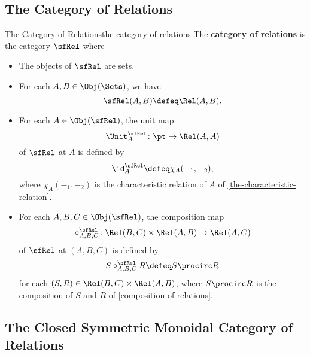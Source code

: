 \subsection{The Category of Relations}\label{subsection-the-category-of-relations}
\begin{definition}{The Category of Relations}{the-category-of-relations}%
    The \textbf{category of relations} is the category $\sfRel$ where
    \begin{itemize}
        \item{}The objects of $\sfRel$ are sets.
        \item{}For each $A,B\in\Obj(\Sets)$, we have
            \[
                \sfRel(A,B)
                \defeq
                \Rel(A,B).
            \]%
        \item{}For each $A\in\Obj(\sfRel)$, the unit map
            \[
                \Unit^{\sfRel}_{A}
                \colon
                \pt
                \to
                \Rel(A,A)
            \]%
            of $\sfRel$ at $A$ is defined by
            \[
                \id^{\sfRel}_{A}
                \defeq
                \chi_{A}(-_{1},-_{2}),
            \]%
            where $\chi_{A}(-_{1},-_{2})$ is the characteristic relation of $A$ of \cref{the-characteristic-relation}.
        \item{}For each $A,B,C\in\Obj(\sfRel)$, the composition map
            \[
                \circ^{\sfRel}_{A,B,C}%
                \colon%
                \Rel(B,C)%
                \times%
                \Rel(A,B)%
                \to%
                \Rel(A,C)%
            \]%
            of $\sfRel$ at $(A,B,C)$ is defined by%
            \[
                S\mathbin{{\circ}^{\sfRel}_{A,B,C}}R
                \defeq
                S\procirc R
            \]%
            for each $(S,R)\in\Rel(B,C)\times\Rel(A,B)$, where $S\procirc R$ is the composition of $S$ and $R$ of \cref{composition-of-relations}.
    \end{itemize}
\end{definition}
\subsection{The Closed Symmetric Monoidal Category of Relations}\label{subsection-the-closed-symmetric-monoidal-category-of-relations}
